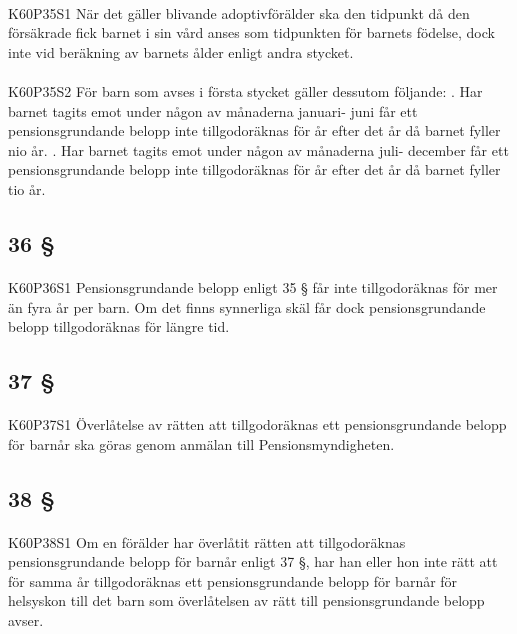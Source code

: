 \documentclass[a4paper,notitlepage,openany,10pt]{book}
\begin{document}
\paragraph*{}
{\tiny K60P35S1}
När det gäller blivande adoptivförälder ska den tidpunkt då den försäkrade fick barnet i sin vård anses som tidpunkten för barnets födelse, dock inte vid beräkning av barnets ålder enligt andra stycket.
\paragraph*{}
{\tiny K60P35S2}
För barn som avses i första stycket gäller dessutom följande:
. Har barnet tagits emot under någon av månaderna januari- juni får ett pensionsgrundande belopp inte tillgodoräknas för år efter det år då barnet fyller nio år.
. Har barnet tagits emot under någon av månaderna juli- december får ett pensionsgrundande belopp inte tillgodoräknas för år efter det år då barnet fyller tio år.
\subsection*{36 §}
\paragraph*{}
{\tiny K60P36S1}
Pensionsgrundande belopp enligt 35 § får inte tillgodoräknas för mer än fyra år per barn. Om det finns synnerliga skäl får dock pensionsgrundande belopp tillgodoräknas för längre tid.
\subsection*{37 §}
\paragraph*{}
{\tiny K60P37S1}
Överlåtelse av rätten att tillgodoräknas ett pensionsgrundande belopp för barnår ska göras genom anmälan till Pensionsmyndigheten.
\subsection*{38 §}
\paragraph*{}
{\tiny K60P38S1}
Om en förälder har överlåtit rätten att tillgodoräknas pensionsgrundande belopp för barnår enligt 37 §, har han eller hon inte rätt att för samma år tillgodoräknas ett pensionsgrundande belopp för barnår för helsyskon till det barn som överlåtelsen av rätt till pensionsgrundande belopp avser.
\end{document}
